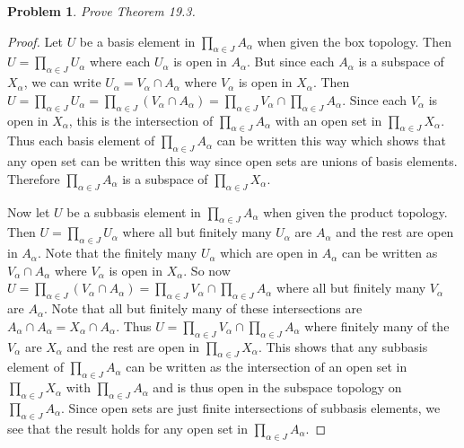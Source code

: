 \documentclass{article}
\newtheorem{problem}{Problem}
\begin{document}
\begin{problem}
Prove Theorem 19.3.
\end{problem}
\begin{proof}
Let $U$ be a basis element in $\prod_{\alpha \in J} A_{\alpha}$ when given the box topology. Then $U = \prod_{\alpha \in J} U_{\alpha}$ where each $U_{\alpha}$ is open in $A_{\alpha}$. But since each $A_{\alpha}$ is a subspace of $X_{\alpha}$, we can write $U_{\alpha} = V_{\alpha} \cap A_{\alpha}$ where $V_{\alpha}$ is open in $X_{\alpha}$. Then $U = \prod_{\alpha \in J} U_{\alpha} = \prod_{\alpha \in J} (V_{\alpha} \cap A_{\alpha}) = \prod_{\alpha \in J} V_{\alpha} \cap \prod_{\alpha \in J} A_{\alpha}$. Since each $V_{\alpha}$ is open in $X_{\alpha}$, this is the intersection of $\prod_{\alpha \in J} A_{\alpha}$ with an open set in $\prod_{\alpha \in J} X_{\alpha}$. Thus each basis element of $\prod_{\alpha \in J} A_{\alpha}$ can be written this way which shows that any open set can be written this way since open sets are unions of basis elements. Therefore $\prod_{\alpha \in J} A_{\alpha}$ is a subspace of $\prod_{\alpha \in J} X_{\alpha}$.

Now let $U$ be a subbasis element in $\prod_{\alpha \in J} A_{\alpha}$ when given the product topology. Then $U = \prod_{\alpha \in J} U_{\alpha}$ where all but finitely many $U_{\alpha}$ are $A_{\alpha}$ and the rest are open in $A_{\alpha}$. Note that the finitely many $U_{\alpha}$ which are open in $A_{\alpha}$ can be written as $V_{\alpha} \cap A_{\alpha}$ where $V_{\alpha}$ is open in $X_{\alpha}$. So now $U = \prod_{\alpha \in J} (V_{\alpha} \cap A_{\alpha}) = \prod_{\alpha \in J} V_{\alpha} \cap \prod_{\alpha \in J} A_{\alpha}$ where all but finitely many $V_{\alpha}$ are $A_{\alpha}$. Note that all but finitely many of these intersections are $A_{\alpha} \cap A_{\alpha} = X_{\alpha} \cap A_{\alpha}$. Thus $U = \prod_{\alpha \in J} V_{\alpha} \cap \prod_{\alpha \in J} A_{\alpha}$ where finitely many of the $V_{\alpha}$ are $X_{\alpha}$ and the rest are open in $\prod_{\alpha \in J} X_{\alpha}$. This shows that any subbasis element of $\prod_{\alpha \in J} A_{\alpha}$ can be written as the intersection of an open set in $\prod_{\alpha \in J} X_{\alpha}$ with $\prod_{\alpha \in J} A_{\alpha}$ and is thus open in the subspace topology on $\prod_{\alpha \in J} A_{\alpha}$. Since open sets are just finite intersections of subbasis elements, we see that the result holds for any open set in $\prod_{\alpha \in J} A_{\alpha}$.
\end{proof}
\end{document}
